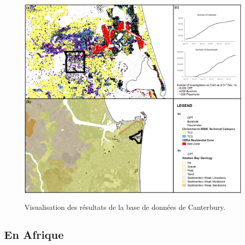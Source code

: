        
        \begin{figure}[t]
        \centering
        \includegraphics[width=1\textwidth]{cgd.png}
        \label{image-cdg}
        \caption{Visualisation des résultats de la base de données de Canterbury.}
        \end{figure}

         \paragraph{}

         \subsection{En Afrique}
